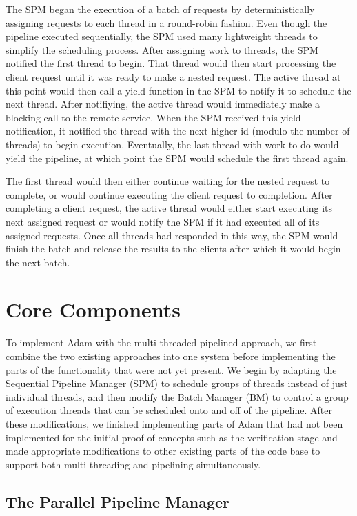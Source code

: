 \documentclass[11pt, oneside]{report}
\begin{document}
The SPM began the execution of a batch of requests by deterministically assigning requests to each thread in a round-robin fashion.
Even though the pipeline executed sequentially, the SPM used many lightweight threads to simplify the scheduling process. 
After assigning work to threads, the SPM notified the first thread to begin. 
That thread would then start processing the client request until it was ready to make a nested request. 
The active thread at this point would then call a yield function in the SPM to notify it to schedule the next thread. After notifiying, the active thread would immediately make a blocking call to the remote service. 
When the SPM received this yield notification, it notified the thread with the next higher id (modulo the number of threads) to begin execution. 
Eventually, the last thread with work to do would yield the pipeline, at which point the SPM would schedule the first thread again. 

The first thread would then either continue waiting for the nested request to complete, or would continue executing the client request to completion. 
After completing a client request, the active thread would either start executing its next assigned request or would notify the SPM if it had executed all of its assigned requests.
Once all threads had responded in this way, the SPM would finish the batch and release the results to the clients after which it would begin the next batch.

\section{Core Components}

To implement Adam with the multi-threaded pipelined approach, we first combine the two existing approaches into one system before implementing the parts of the functionality that were not yet present. 
We begin by adapting the Sequential Pipeline Manager (SPM) to schedule groups of threads instead of just individual threads, and then modify the Batch Manager (BM) to control a group of execution threads that can be scheduled onto and off of the pipeline.
After these modifications, we finished implementing parts of Adam that had not been implemented for the initial proof of concepts such as the verification stage and made appropriate modifications to other existing parts of the code base to support both multi-threading and pipelining simultaneously.

\subsection{The Parallel Pipeline Manager}
\end{document}
